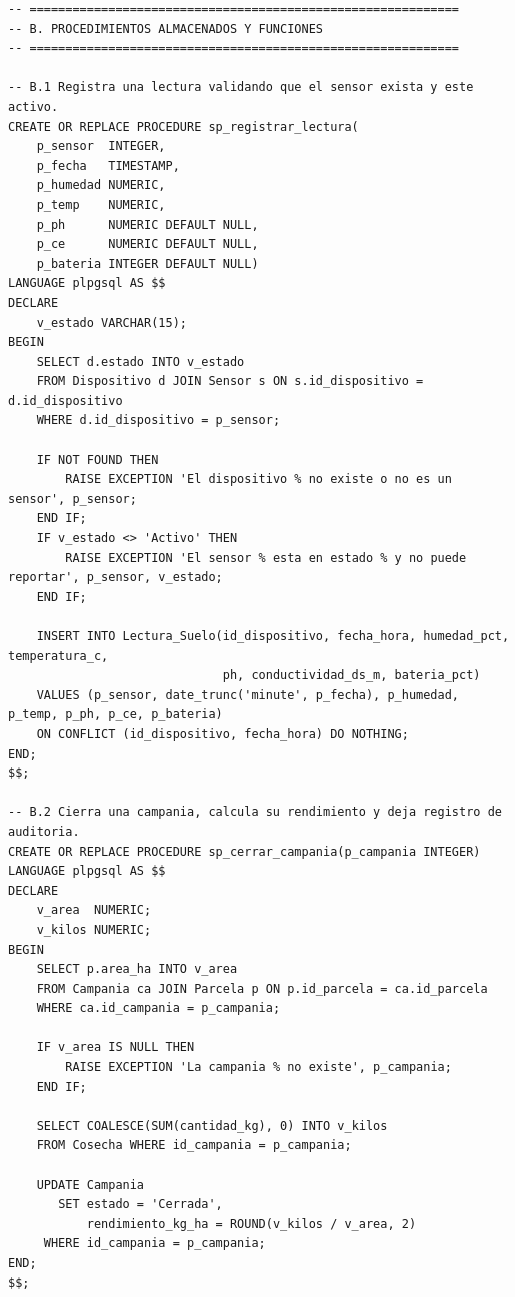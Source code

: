 \documentclass[11pt,letterpaper]{article}
\begin{document}
\begin{lstlisting}[style=sql]
-- ============================================================
-- B. PROCEDIMIENTOS ALMACENADOS Y FUNCIONES
-- ============================================================

-- B.1 Registra una lectura validando que el sensor exista y este activo.
CREATE OR REPLACE PROCEDURE sp_registrar_lectura(
    p_sensor  INTEGER,
    p_fecha   TIMESTAMP,
    p_humedad NUMERIC,
    p_temp    NUMERIC,
    p_ph      NUMERIC DEFAULT NULL,
    p_ce      NUMERIC DEFAULT NULL,
    p_bateria INTEGER DEFAULT NULL)
LANGUAGE plpgsql AS $$
DECLARE
    v_estado VARCHAR(15);
BEGIN
    SELECT d.estado INTO v_estado
    FROM Dispositivo d JOIN Sensor s ON s.id_dispositivo = d.id_dispositivo
    WHERE d.id_dispositivo = p_sensor;

    IF NOT FOUND THEN
        RAISE EXCEPTION 'El dispositivo % no existe o no es un sensor', p_sensor;
    END IF;
    IF v_estado <> 'Activo' THEN
        RAISE EXCEPTION 'El sensor % esta en estado % y no puede reportar', p_sensor, v_estado;
    END IF;

    INSERT INTO Lectura_Suelo(id_dispositivo, fecha_hora, humedad_pct, temperatura_c,
                              ph, conductividad_ds_m, bateria_pct)
    VALUES (p_sensor, date_trunc('minute', p_fecha), p_humedad, p_temp, p_ph, p_ce, p_bateria)
    ON CONFLICT (id_dispositivo, fecha_hora) DO NOTHING;
END;
$$;

-- B.2 Cierra una campania, calcula su rendimiento y deja registro de auditoria.
CREATE OR REPLACE PROCEDURE sp_cerrar_campania(p_campania INTEGER)
LANGUAGE plpgsql AS $$
DECLARE
    v_area  NUMERIC;
    v_kilos NUMERIC;
BEGIN
    SELECT p.area_ha INTO v_area
    FROM Campania ca JOIN Parcela p ON p.id_parcela = ca.id_parcela
    WHERE ca.id_campania = p_campania;

    IF v_area IS NULL THEN
        RAISE EXCEPTION 'La campania % no existe', p_campania;
    END IF;

    SELECT COALESCE(SUM(cantidad_kg), 0) INTO v_kilos
    FROM Cosecha WHERE id_campania = p_campania;

    UPDATE Campania
       SET estado = 'Cerrada',
           rendimiento_kg_ha = ROUND(v_kilos / v_area, 2)
     WHERE id_campania = p_campania;
END;
$$;


\end{lstlisting}
\end{document}
